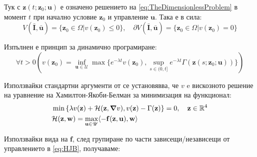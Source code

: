 Тук с $\mathbf{z}(t; \mathbf{z}_0; \mathbf{u})$ е означено решението на \eqref{eq:TheDimensionlessProblem} в момент $t$ при начално условие $\mathbf{z}_0$ и управление $\mathbf{u}$. Така е в сила:
\begin{equation}
  V(\bar{\mathbf{I}}, \bar{\mathbf{u}}) = \{\mathbf{z}_0 \in \Omega \vert v(\mathbf{z}_0) \leq 0 \}, \quad \partial V(\bar{\mathbf{I}}, \bar{\mathbf{u}}) = \{\mathbf{z}_0 \in \Omega \vert v(\mathbf{z}_0) = 0\}
\end{equation}

Изпълнен е принцип за динамично програмиране:
\begin{equation}
  \forall{t>0} \left(v(\mathbf{z}_0) = \inf_{\mathbf{u} \in \mathscr{U}} \max\{e^{-\lambda t} v(\mathbf{z}_0), \sup_{s \in (0, t]} e^{-\lambda t} \Gamma(\mathbf{z}(s; \mathbf{z}_0; \mathbf{u}))\}\right)
\end{equation}

Използвайки стандартни аргументи от \cite{Bardi1997} се установявва, че $v$ e вискозното решение на уравнение на Хамилтон-Якоби-Белман за минимизация на функционал:
\begin{equation}
  \label{eq:HJB}
  \begin{split}
    &\min\left\{\lambda v(\mathbf{z}) + \mathcal{H}(\mathbf{z}, \grad{v}), v(\mathbf{z}) - \Gamma(\mathbf{z})\right\} = 0, \quad \mathbf{z} \in \mathbb{R}^4 \\
    &\mathcal{H}(\mathbf{z}, \mathbf{w}) = \max_{\mathbf{u} \in \mathscr{U}} \langle -\mathbf{f}(\mathbf{z}, \mathbf{u}), \mathbf{w} \rangle
  \end{split}
\end{equation}

Използвайки вида на $\mathbf{f}$, след групиране по части зависещи/независещи от управлението в \eqref{eq:HJB}, получаваме:

